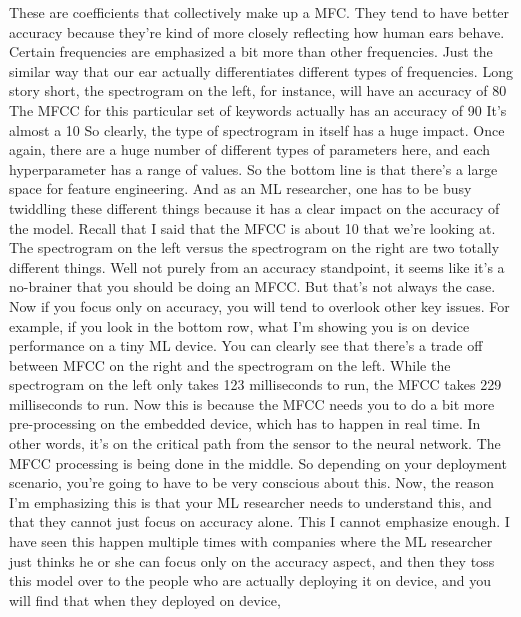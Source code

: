     These are coefficients that collectively make up a MFC.
    They tend to have better accuracy because they're
    kind of more closely reflecting how human ears behave.
    Certain frequencies are emphasized a bit more than other frequencies.
    Just the similar way that our ear actually
    differentiates different types of frequencies.
    Long story short, the spectrogram on the left, for instance,
    will have an accuracy of 80%
    The MFCC for this particular set of keywords
    actually has an accuracy of 90%
    It's almost a 10%
    So clearly, the type of spectrogram in itself has a huge impact.
    Once again, there are a huge number of different types of parameters here,
    and each hyperparameter has a range of values.
    So the bottom line is that there's a large space for feature engineering.
    And as an ML researcher, one has to be busy twiddling these different things
    because it has a clear impact on the accuracy of the model.
    Recall that I said that the MFCC is about 10%
    that we're looking at.
    The spectrogram on the left versus the spectrogram on the right
    are two totally different things.
    Well not purely from an accuracy standpoint,
    it seems like it's a no-brainer that you should be doing an MFCC.
    But that's not always the case.
    Now if you focus only on accuracy, you will tend to overlook other key issues.
    For example, if you look in the bottom row, what I'm showing
    you is on device performance on a tiny ML device.
    You can clearly see that there's a trade off between MFCC on the right
    and the spectrogram on the left.
    While the spectrogram on the left only takes 123 milliseconds to run,
    the MFCC takes 229 milliseconds to run.
    Now this is because the MFCC needs you to do a bit more pre-processing
    on the embedded device, which has to happen in real time.
    In other words, it's on the critical path
    from the sensor to the neural network.
    The MFCC processing is being done in the middle.
    So depending on your deployment scenario,
    you're going to have to be very conscious about this.
    Now, the reason I'm emphasizing this is that your ML researcher needs
    to understand this, and that they cannot just focus on accuracy alone.
    This I cannot emphasize enough.
    I have seen this happen multiple times with companies
    where the ML researcher just thinks he or she can focus only on the accuracy
    aspect, and then they toss this model over to the people who are actually
    deploying it on device, and you will find that when they deployed on device,
